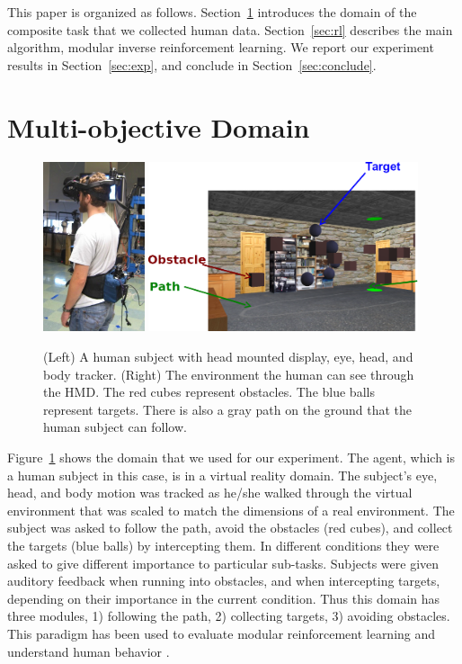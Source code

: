 \documentclass[11pt]{article} %
\begin{document}
This paper is organized as follows. Section~\ref{sec:domain} introduces the
domain of the composite task that we collected human data. Section~\ref{sec:rl}
describes the main algorithm, modular inverse reinforcement learning. We report
our experiment results in Section~\ref{sec:exp}, and conclude in
Section~\ref{sec:conclude}.

\section{Multi-objective Domain}
\label{sec:domain}

\begin{figure}[h!]
\centering
\includegraphics[height=5cm]{human.jpg}
\includegraphics[height=5cm]{env.png}
\caption{(Left) A human subject with head mounted display, eye, head, and
body tracker.  (Right) The environment the human can see through the HMD.
The red cubes represent obstacles. The blue balls represent targets. There is
also a gray path on the ground that the human subject can follow.}
\label{fig:avatar}
\end{figure}

Figure~\ref{fig:avatar} shows the domain that we used for our experiment. The
agent, which is a human subject in this case, is in a virtual reality domain.
The subject’s eye, head, and body motion was tracked as he/she walked through the virtual environment that was scaled to match the dimensions of a real environment. The subject was asked to follow the path, avoid the obstacles (red cubes), and collect the targets (blue balls) by intercepting them. In different conditions they were asked to give different importance to particular sub-tasks. Subjects were given auditory feedback when 
running into obstacles, and when intercepting targets, depending on their importance in the current condition. Thus this domain has three modules, 1) following the path, 2)
collecting targets, 3) avoiding obstacles.
This paradigm has been used to evaluate modular reinforcement
learning \cite{rothkopf2013modular} and understand human behavior \cite{Tong2014}.
\end{document}
